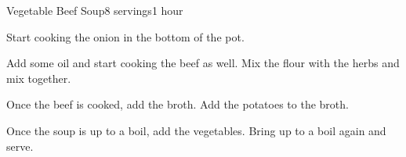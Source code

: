 \documentclass[../Cookbook.tex]{subfiles}
\begin{document}
\begin{recipe}{Vegetable Beef Soup}{8 servings}{1 hour}

Start cooking the onion in the bottom of the pot.

Add some oil and start cooking the beef as well. Mix the flour with the herbs and mix together.

Once the beef is cooked, add the broth. Add the potatoes to the broth.

Once the soup is up to a boil, add the vegetables. Bring up to a boil again and serve.

\end{recipe}
\end{document}
